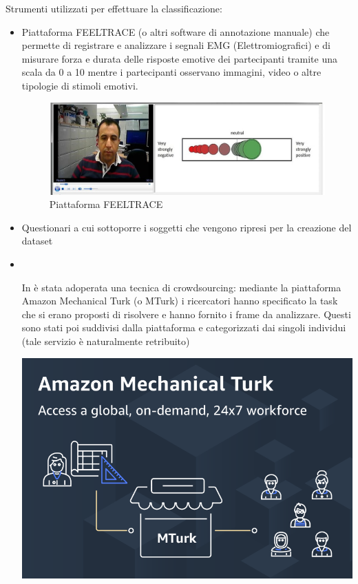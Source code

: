 Strumenti utilizzati per effettuare la classificazione:
\begin{itemize}
    \item Piattaforma FEELTRACE (o altri software di annotazione manuale) che permette di registrare e analizzare i segnali EMG (Elettromiografici) e di misurare forza e durata delle risposte emotive dei partecipanti tramite una scala da 0 a 10 mentre i partecipanti osservano immagini, video o altre tipologie di stimoli emotivi. \cite{AFEWVAdatabaseInTheWild}
    \begin{figure}[h]
        \centering    
            \includegraphics[width=0.5\linewidth]{images/11.jpg}
            \caption{Piattaforma FEELTRACE}
    \end{figure}
    \item Questionari a cui sottoporre i soggetti che vengono ripresi per la creazione del dataset
        \item \mbox{}\\[-\baselineskip]
        \begin{minipage}[t]{0.6\textwidth}
            In \cite{StudEngagDataset} è stata adoperata una tecnica di crowdsourcing: mediante la piattaforma Amazon Mechanical Turk (o MTurk) i ricercatori hanno specificato la task che si erano proposti di risolvere e hanno fornito i frame da analizzare. Questi sono stati poi suddivisi dalla piattaforma e categorizzati dai singoli individui (tale servizio è naturalmente retribuito)
        \end{minipage}\hfill
        \begin{minipage}[t]{0.3\textwidth}
            \centering
            \vspace{0pt}
            \includegraphics[width=\textwidth]{images/12.png}
        \end{minipage}
\end{itemize}


